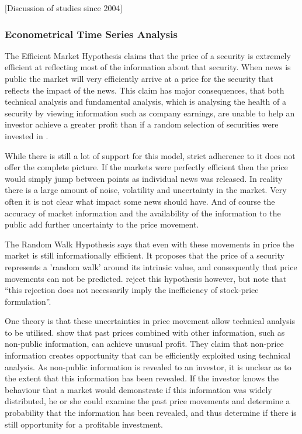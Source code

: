 \documentclass{article}
\theoremstyle{definition}
\begin{document}
[Discussion of studies since 2004]

\subsubsection{Econometrical Time Series Analysis}

The Efficient Market Hypothesis claims that the price of a security is extremely efficient at reflecting most of the information about that security. When news is public the market will very efficiently arrive at a price for the security that reflects the impact of the news. This claim has major consequences, that both technical analysis and fundamental analysis, which is analysing the health of a security by viewing information such as company earnings, are unable to help an investor achieve a greater profit than if a random selection of securities were invested in \citep{emhAndCritics}. 

While there is still a lot of support for this model, strict adherence to it does not offer the complete picture. If the markets were perfectly efficient then the price would simply jump between points as individual news was released. In reality there is a large amount of noise, volatility and uncertainty in the market. Very often it is not clear what impact some news should have. And of course the accuracy of market information and the availability of the information to the public add further uncertainty to the price movement.

The Random Walk Hypothesis says that even with these movements in price the market is still informationally efficient. It proposes that the price of a security represents a 'random walk' around its intrinsic value, and consequently that price movements can not be predicted. \cite{lo1988} reject this hypothesis however, but note that ``this rejection does not necessarily imply the inefficiency of stock-price formulation''.

One theory is that these uncertainties in price movement allow technical analysis to be utilised. \cite{indefenseof} show that past prices combined with other information, such as non-public information, can achieve unusual profit. They claim that non-price information creates opportunity that can be efficiently exploited using technical analysis. As non-public information is revealed to an investor, it is unclear as to the extent that this information has been revealed. If the investor knows the behaviour that a market would demonstrate if this information was widely distributed, he or she could examine the past price movements and determine a probability that the information has been revealed, and thus determine if there is still opportunity for a profitable investment.
\end{document}
